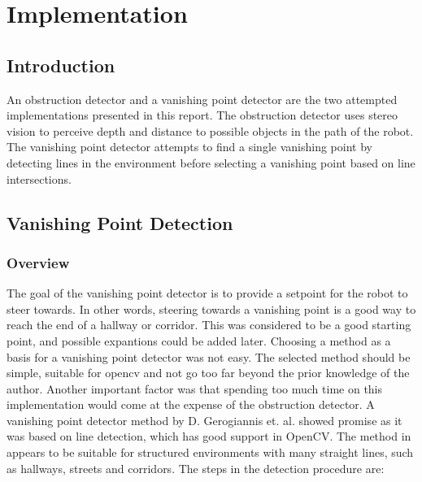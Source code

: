\chapter{Implementation}\label{chp:implementation}

\section{Introduction}

An obstruction detector and a vanishing point detector are the two attempted implementations presented in this report. The obstruction detector uses stereo vision to perceive depth and distance to possible objects in the path of the robot. The vanishing point detector attempts to find a single vanishing point by detecting lines in the environment before selecting a vanishing point based on line intersections. 

\section{Vanishing Point Detection}

\subsection{Overview}

The goal of the vanishing point detector is to provide a setpoint for the robot to steer towards. In other words, steering towards a vanishing point is a good way to reach the end of a hallway or corridor. This was considered to be a good starting point, and possible expantions could be added later. Choosing a method as a basis for a vanishing point detector was not easy. The selected method should be simple, suitable for \gls{opencv} and not go too far beyond the prior knowledge of the author. Another important factor was that spending too much time on this implementation would come at the expense of the obstruction detector. A vanishing point detector method by D. Gerogiannis et. al. \cite{gerogiannisvp} showed promise as it was based on line detection, which has good support in OpenCV. The method in \cite{gerogiannisvp} appears to be suitable for structured environments with many straight lines, such as hallways, streets and corridors. The steps in the detection procedure are:

